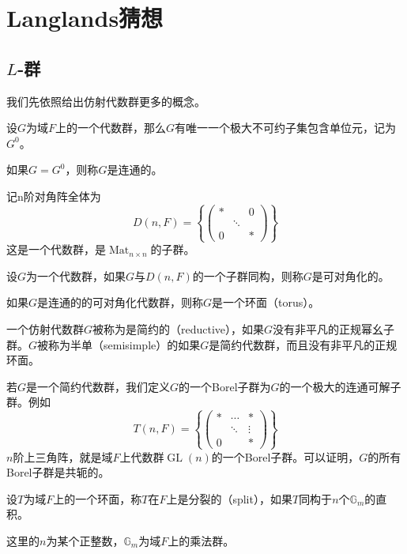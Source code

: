 \chapter{Langlands猜想}
\label{chap:langlands}

\section{\texorpdfstring{$L$}{L}-群}
\label{sec:l_gp}
我们先依照给出仿射代数群更多的概念。

设$G$为域$F$上的一个代数群，那么$G$有唯一一个极大不可约子集包含单位元，记为$G^0$。

\begin{definition}
如果$G = G^0$，则称$G$是连通的。
\end{definition}
记n阶对角阵全体为
$$
D(n,F) = \left\{ \begin{pmatrix} \ast & & 0 \\ & \ddots & \\ 0 & & \ast\end{pmatrix} \right\}
$$
这是一个代数群，是$\operatorname{Mat}_{n\times n}$的子群。

\begin{definition}
设$G$为一个代数群，如果$G$与$D(n, F)$的一个子群同构，则称$G$是可对角化的。
\end{definition}

\begin{definition}
如果$G$是连通的的可对角化代数群，则称$G$是一个环面（torus）。
\end{definition}

\begin{definition}
一个仿射代数群$G$被称为是简约的（reductive），如果$G$没有非平凡的正规幂幺子群。$G$被称为半单（semisimple）的如果$G$是简约代数群，而且没有非平凡的正规环面。
\end{definition}
若$G$是一个简约代数群，我们定义$G$的一个Borel子群为$G$的一个极大的连通可解子群。例如
$$
T(n,F) = \left\{ \begin{pmatrix} \ast & \cdots & \ast \\ & \ddots & \vdots \\ 0 & & \ast \end{pmatrix} \right\}
$$
$n$阶上三角阵，就是域$F$上代数群$\operatorname{GL}(n)$的一个Borel子群。可以证明，$G$的所有Borel子群是共轭的。

\begin{definition}
设$T$为域$F$上的一个环面，称$T$在$F$上是分裂的（split），如果$T$同构于$n$个$\mathbb{G}_m$的直积。
\end{definition}
这里的$n$为某个正整数，$\mathbb{G}_m$为域$F$上的乘法群。

